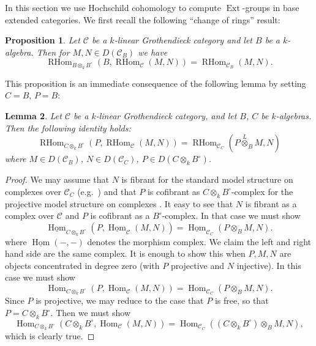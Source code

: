 \documentclass{amsart}
\numberwithin{equation}{section}
\let\cal\mathcal
\newtheorem{lemma}{Lemma}[section]
\newtheorem{proposition}[lemma]{Proposition}
\theoremstyle{definition}
\theoremstyle{remark}
\begin{document}
In this section we use Hochschild cohomology to compute ${\operatorname {Ext}}$-groups in base extended categories.
We first recall the following ``change of rings'' result:
\begin{proposition}
Let ${{\cal C}}$ be a $k$-linear Grothendieck category and let $B$ be a $k$-algebra. Then for $M,N \in D({{\cal C}}_B)$ we have
\begin{equation}
\label{ref-4.1-21}
{\operatorname {RHom}}_{B\otimes_k B^{\circ}}(B,{\operatorname {RHom}}_{{\cal C}}(M,N))={\operatorname {RHom}}_{{{\cal C}}_B}(M,N).
\end{equation}
\end{proposition}
This proposition is an immediate consequence of the following lemma by setting  $C=B$, $P=B$:
\begin{lemma}
\label{ref-4.2-22}
Let ${{\cal C}}$ be a $k$-linear Grothendieck category, and let $B$, $C$ be $k$-algebras. Then the following
identity holds:
\begin{equation}
\label{ref-4.2-23}
{\operatorname {RHom}}_{C\otimes_k B^{\circ}}(P,{\operatorname {RHom}}_{{\cal C}}(M,N))={\operatorname {RHom}}_{{{\cal C}}_C}(P{\overset{L}{\otimes}}_B M,N)
\end{equation}
where $M\in D({{\cal C}}_B)$, $N\in D({{\cal C}}_C)$, $P\in D(C\otimes_k B^\circ)$.
\end{lemma}
\begin{proof}
  We may assume that $N$ is fibrant for the standard model
  structure on complexes over ${{\cal C}}_C$ (e.g.\ \cite{Beke}) and that $P$ is
  cofibrant as $C\otimes_k B^\circ$-complex for the projective model
  structure on complexes \cite{Hovey}.  It easy to see that $N$ is
  fibrant as a complex over ${{\cal C}}$ and $P$ is cofibrant as a
  $B^\circ$-complex. In that case we must show
\[
\underline{\operatorname {Hom}}_{C\otimes_k B^{\circ}}(P,\underline{\operatorname {Hom}}_{{\cal C}}(M,N))=\underline{\operatorname {Hom}}_{{{\cal C}}_C}(P\otimes_B M,N).
\]
where $\underline{\operatorname {Hom}}(-,-)$ denotes the morphism complex.
We claim the left and right hand side are the same complex.
It is enough to show this when $P,M,N$ are  objects concentrated in degree zero (with $P$ projective and
$N$ injective). In this
case we must show
\[
{\operatorname {Hom}}_{C\otimes_k B^{\circ}}(P,{\operatorname {Hom}}_{{\cal C}}(M,N))={\operatorname {Hom}}_{{{\cal C}}_C}(P\otimes_B M,N).
\]
Since $P$ is projective, we may reduce to the case that $P$ is free, so that $P=C\otimes_k B^\circ$. Then
we must show
\[
{\operatorname {Hom}}_{C\otimes_k B^{\circ}}(C\otimes_k B^{\circ},{\operatorname {Hom}}_{{\cal C}}(M,N))={\operatorname {Hom}}_{{{\cal C}}_C}((C\otimes_k B^\circ)\otimes_B M,N),
\]
which is clearly true.
\end{proof}
\end{document}
